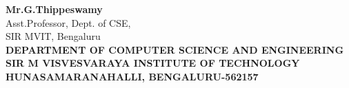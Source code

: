 \begin{center}
\textbf{Mr.G.Thippeswamy}\\
\vspace{5mm}
Asst.Professor, Dept. of CSE,\\
\vspace{5mm}
SIR MVIT, Bengaluru\\
\vspace{5mm}
\textbf{DEPARTMENT OF COMPUTER SCIENCE AND ENGINEERING}\\
\vspace{2mm}
\textbf{SIR M VISVESVARAYA INSTITUTE OF TECHNOLOGY}\\
\vspace{2mm}
\textbf{HUNASAMARANAHALLI, BENGALURU-562157}\\

\end{center}
%